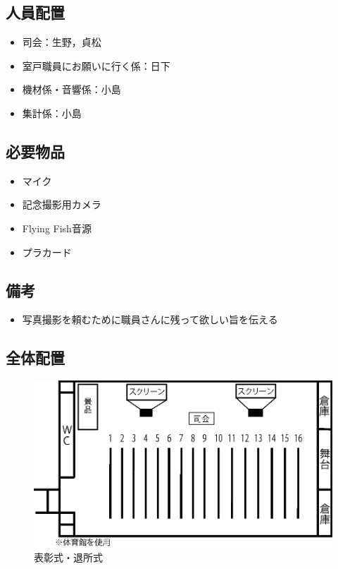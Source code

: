 \subsection{人員配置}
\begin{itemize}
\item 司会：生野，貞松
\item 室戸職員にお願いに行く係：日下
\item 機材係・音響係：小島
\item 集計係：小島
\end{itemize}


\subsection{必要物品}
\begin{itemize}
\item マイク
\item 記念撮影用カメラ
\item Flying Fish音源
\item プラカード
\end{itemize}
\subsection{備考}
\begin{itemize}
\item 写真撮影を頼むために職員さんに残って欲しい旨を伝える
\end{itemize}

\subsection{全体配置}
\begin{figure}[htbp]
  \begin{center}
  \includegraphics[width = 15cm]{./24/hyousyou.eps}
  \caption{表彰式・退所式}
  \end{center}
\end{figure}

%
